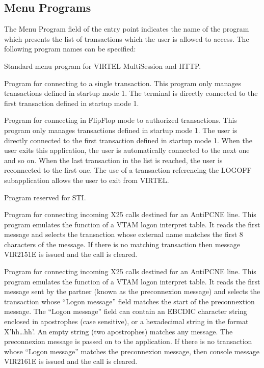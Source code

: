 \documentclass[letterpaper,10pt,english]{sphinxmanual}
\begin{document}
\subsection{Menu Programs}
\label{\detokenize{connectivity_guide:menu-programs}}\label{\detokenize{connectivity_guide:index-114}}
\sphinxAtStartPar
The Menu Program field of the entry point indicates the name of the program which presents the list of transactions which the user is allowed to access. The following program names can be specified:
\begin{description}
\sphinxAtStartPar
Standard menu program for VIRTEL Multi\sphinxhyphen{}Session and HTTP.

\sphinxAtStartPar
Program for connecting to a single transaction. This program only manages transactions defined in startup mode 1. The terminal is directly connected to the first transaction defined in startup mode 1.

\sphinxAtStartPar
Program for connecting in Flip\sphinxhyphen{}Flop mode to authorized transactions. This program only manages transactions defined in startup mode 1. The user is directly connected to the first transaction defined in startup mode 1. When the user exits this application, the user is automatically connected to the next one and so on. When the last transaction in the list is reached, the user is reconnected to the first one. The use of a transaction referencing the LOGOFF subapplication allows the user to exit from VIRTEL.

\sphinxAtStartPar
Program reserved for STI.

\sphinxAtStartPar
Program for connecting incoming X25 calls destined for an AntiPCNE line. This program emulates the function of a VTAM logon interpret table. It reads the first message and selects the transaction whose external name matches the first 8 characters of the message. If there is no matching transaction then message VIR2151E is issued and the call is cleared.

\sphinxAtStartPar
Program for connecting incoming X25 calls destined for an AntiPCNE line. This program emulates the function of a VTAM logon interpret table. It reads the first message sent by the partner (known as the pre\sphinxhyphen{}connexion message) and selects the transaction whose “Logon message” field matches the start of the pre\sphinxhyphen{}connextion message. The “Logon message” field can contain an EBCDIC character string enclosed in apostrophes (case sensitive), or a hexadecimal string in the format X’hh…hh’. An empty string (two apostrophes) matches any message. The pre\sphinxhyphen{}connexion message is passed on to the application. If there is no transaction whose “Logon message” matches the pre\sphinxhyphen{}connexion message, then console message VIR2161E is issued and the call is cleared.


\end{description}
\end{document}
